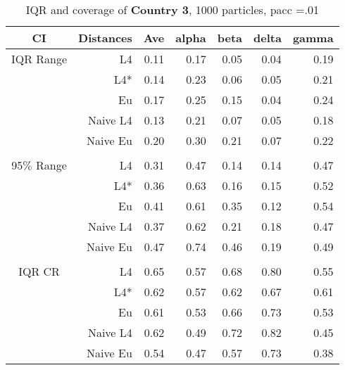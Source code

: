 \documentclass[a4paper,12pt,twoside]{book}
\begin{document}
\begin{table}[H]
\centering
\caption{IQR and coverage of \textbf{Country 3}, 1000 particles, pacc =.01}

\begin{tabular}{crrrrrr}
  \hline
{\color{blue}CI} & Distances & Ave & alpha & beta & delta & gamma \\ 
  \hline
{\color{blue}IQR Range} & L4  &0.11 & 0.17 & 0.05 & 0.04 & 0.19 \\ 
   
&L4*  &0.14 & 0.23 & 0.06 & 0.05 & 0.21 \\ 
  
&Eu &  0.17 & 0.25 & 0.15 & 0.04 & 0.24 \\ 
  
&Naive L4&     0.13 & 0.21 & 0.07 & 0.05 & 0.18 \\
  
&Naive Eu &     0.20 & 0.30 & 0.21 & 0.07 & 0.22 \\ 
 
   \\ 
    {\color{blue}95$\%$ Range} & L4  &0.31 & 0.47 & 0.14 & 0.14 & 0.47 \\ 
  
    &L4*  & 0.36 & 0.63 & 0.16 & 0.15 & 0.52 \\ 
  
&Eu &  0.41 & 0.61 & 0.35 & 0.12 & 0.54 \\ 
  
&Naive L4&     0.37 & 0.62 & 0.21 & 0.18 & 0.47 \\ 
 
&Naive Eu &     0.47 & 0.74 & 0.46 & 0.19 & 0.49 \\ 
  
\\   
   \hline
   
{\color{blue} IQR CR } & L4  &0.65 & 0.57 & 0.68 & 0.80 & 0.55 \\ 

&L4*  &    0.62 & 0.57 & 0.62 & 0.67 & 0.61 \\ 
 
&Eu &     0.61 & 0.53 & 0.66 & 0.73 & 0.53 \\ 
  
  
&Naive L4&  0.62 & 0.49 & 0.72 & 0.82 & 0.45 \\
 
&Naive Eu & 0.54 & 0.47 & 0.57 & 0.73 & 0.38 \\ 
 


\end{tabular}
\end{table}
\end{document}
